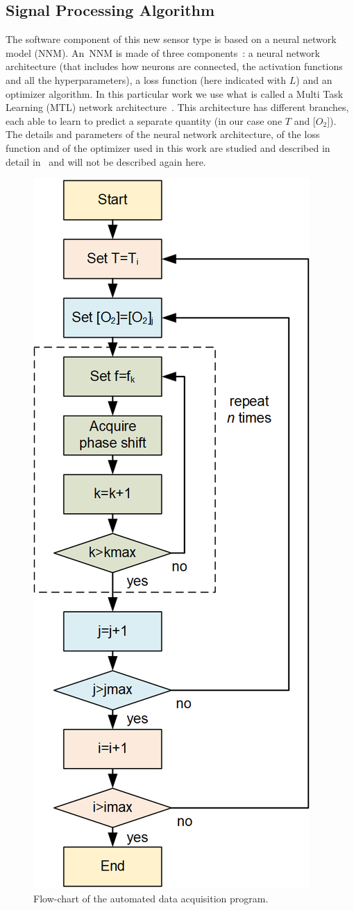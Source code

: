 \documentclass[sensors,article,accept,moreauthors,pdftex,10pt,a4paper]{Definitions/mdpi}
\begin{document}
\subsection{Signal Processing Algorithm}
\label{NN}

The software component of this new sensor type is based on a neural network model (NNM). An~NNM is made of three components~\cite{Michelucci2017}: a neural network architecture (that includes how neurons are connected, the activation functions and all the hyperparameters), a loss function (here indicated with $L$) and an optimizer algorithm. In this particular work we use what is called a Multi Task Learning (MTL) network architecture~\cite{caruana1997multitask}. This architecture has different branches, each able to learn to predict a separate quantity (in our case one $T$ and [$O_2$]). 
The details and parameters of the neural network architecture, of the loss function and of the optimizer used in this work are studied and described in detail in~\cite{Michelucci2019_2} and will not be described again here.

\begin{figure}[H]
\centering
\includegraphics[keepaspectratio, width=5.8 cm]{flow-chart.png}
\caption{Flow-chart of the automated data acquisition program.}
\label{fig:auto-data}
\end{figure}
\end{document}
